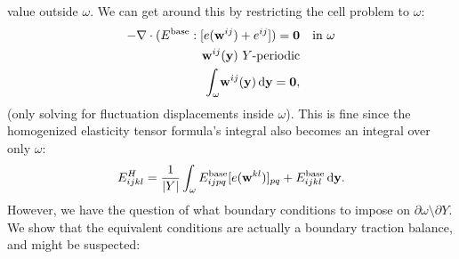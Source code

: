 \documentclass[10pt]{article}
\begin{document}
value outside $\omega$. We can get around this by restricting the cell problem to $\omega$:
\begin{align*}
    -\nabla \cdot (E^\text{base} : [e({\bf w}^{ij}) + e^{ij}]) = {\bf 0} & \quad \text{in } \omega \\
    {\bf w}^{ij}({\bf y})\ Y \text{-periodic} & \\
    \int_\omega \! {\bf w}^{ij}({\bf y})  \, \mathrm{d} {\bf y} =  {\bf 0}, 
\end{align*}
(only solving for fluctuation displacements inside $\omega$). This is fine
since the homogenized elasticity tensor formula's integral also becomes an
integral over only $\omega$:
$$
E^H_{ijkl} = \frac{1}{|Y|} \int_\omega E_{ijpq}^\text{base} [e({\bf w}^{kl})]_{pq} + E_{ijkl}^\text{base} \, \mathrm{d} {\bf y}.
$$
However, we have the question of what boundary conditions to impose on
$\partial \omega \setminus \partial Y$. We show that the equivalent conditions
are actually a boundary traction balance, and might be suspected:
\end{document}
